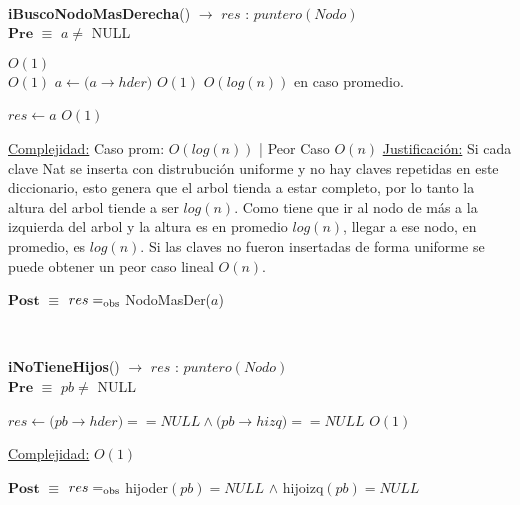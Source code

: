 

~

\begin{algorithm}[H]{\textbf{iBuscoNodoMasDerecha}() $\to$ $res$ : $puntero(Nodo)$}
	{\\ $\textbf{Pre}$ $\equiv$ $a \neq$ NULL}
	\begin{algorithmic}[1]

		 \Comment $O(1)$
		\\
			 \Comment $O(1)$
				\State $a \gets (a$$\rightarrow$$hder)$ \Comment $O(1)$
			\EndWhile \Comment $O(log(n))$ en caso promedio.

		\EndIf

		\State $res \gets a$ \Comment $O(1)$

		\medskip
		\Statex \underline{Complejidad:} Caso prom: $O(log(n))$ | Peor Caso $O(n)$
		\Statex \underline{Justificación:} Si cada clave Nat se inserta con distrubución uniforme y no hay claves repetidas en este diccionario, esto genera que el arbol tienda a estar completo, por lo tanto la altura del arbol tiende a ser $log(n)$. Como tiene que ir al nodo de más a la izquierda del arbol y la altura es en promedio $log(n)$, llegar a ese nodo, en promedio, es $log(n)$. Si las claves no fueron insertadas de forma uniforme se puede obtener un peor caso lineal $O(n)$.

    \end{algorithmic}
    {$\textbf{Post}$ $\equiv$ $res =_{\mathrm{obs}}$ NodoMasDer($a$)}
\end{algorithm}



~


\begin{algorithm}[H]{\textbf{iNoTieneHijos}() $\to$ $res$ : $puntero(Nodo)$}
	{\\ $\textbf{Pre}$ $\equiv$ $pb \neq$ NULL}
	\begin{algorithmic}[1]

		\State $res \gets (pb$$\rightarrow$$hder) == NULL \land (pb$$\rightarrow$$hizq) == NULL$ \Comment $O(1)$

		\medskip
		\Statex \underline{Complejidad:} $O(1)$

    \end{algorithmic}
    {$\textbf{Post}$ $\equiv$ $res =_{\mathrm{obs}}$ hijoder$(pb) = NULL$ $\land$ hijoizq$(pb) = NULL$}
\end{algorithm}


